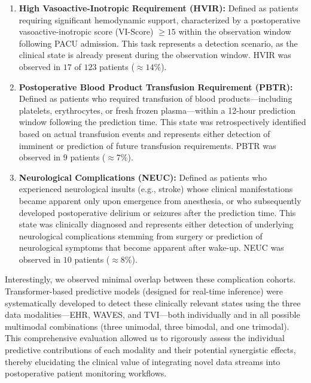 \begin{enumerate}
    \item \textbf{High Vasoactive-Inotropic Requirement (HVIR):} Defined as patients requiring significant hemodynamic support, characterized by a postoperative vasoactive-inotropic score (VI-Score) $\geq 15$ within the observation window following PACU admission. This task represents a detection scenario, as the clinical state is already present during the observation window. HVIR was observed in $17$ of $123$ patients ($\approx 14\%$).

    \item \textbf{Postoperative Blood Product Transfusion Requirement (PBTR):} Defined as patients who required transfusion of blood products—including platelets, erythrocytes, or fresh frozen plasma—within a 12-hour prediction window following the prediction time. This state was retrospectively identified based on actual transfusion events and represents either detection of imminent or prediction of future transfusion requirements. PBTR was observed in $9$ patients ($\approx 7\%$).

    \item \textbf{Neurological Complications (NEUC):} Defined as patients who experienced neurological insults (e.g., stroke) whose clinical manifestations became apparent only upon emergence from anesthesia, or who subsequently developed postoperative delirium or seizures after the prediction time. This state was clinically diagnosed and represents either detection of underlying neurological complications stemming from surgery or prediction of neurological symptoms that become apparent after wake-up. NEUC was observed in $10$ patients ($\approx 8\%$).
\end{enumerate}

Interestingly, we observed minimal overlap between these complication cohorts.
Transformer-based predictive models (designed for real-time inference) were systematically developed to detect these clinically relevant states using the three data modalities—EHR, WAVES, and TVI—both individually and in all possible multimodal combinations (three unimodal, three bimodal, and one trimodal). This comprehensive evaluation allowed us to rigorously assess the individual predictive contributions of each modality and their potential synergistic effects, thereby elucidating the clinical value of integrating novel data streams into postoperative patient monitoring workflows.



